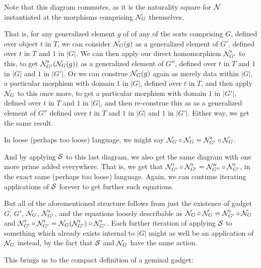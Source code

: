 \begin{observation}
Note that this diagram commutes, as it is the naturality square for $\mathcal{N}$ instantiated at the morphisms comprising $\mathcal{N}_G$ themselves.

That is, for any generalized element $g$ of of any of the sorts comprising $G$, defined over object $t$ in $T$, we can consider $\mathcal{N}_G(g)$ as a generalized element of $G'$, defined over $t$ in $T$ and $1$ in $|G|$. We can then apply our direct homomorphism $\mathcal{N}'_{G'}$ to this, to get $\mathcal{N}'_{G'}(\mathcal{N}_G(g))$ as a generalized element of $G''$, defined over $t$ in $T$ and $1$ in $|G|$ and $1$ in $|G'|$. Or we can construe $\mathcal{N}_G(g)$ again as merely data within $|G|$, a particular morphism with domain $1$ in $|G|$, defined over $t$ in $T$, and then apply $\mathcal{N}_G$ to this once more, to get a particular morphism with domain $1$ in $|G'|$, defined over $t$ in $T$ and $1$ in $|G|$, and then re-construe this as as a generalized element of $G''$ defined over $t$ in $T$ and $1$ in $|G|$ and $1$ in $|G'|$. Either way, we get the same result.

In loose (perhaps too loose) language, we might say $\mathcal{N}_G \circ \mathcal{N}_G = \mathcal{N}'_{G'} \circ \mathcal{N}_G$.

And by applying $\mathcal{S}$ to this last diagram, we also get the same diagram with one more prime added everywhere. That is, we get that $\mathcal{N}'_{G'} \circ \mathcal{N}'_{G'} = \mathcal{N}''_{G''} \circ \mathcal{N}'_{G'}$, in the exact same (perhaps too loose) language. Again, we can continue iterating applications of $\mathcal{S}$ forever to get further such equations.

But all of the aforementioned structure follows from just the existence of gadget $G$, $G'$, $\mathcal{N}_G$, $\mathcal{N}'_{G'}$, and the equations loosely describable as $\mathcal{N}_G \circ \mathcal{N}_G = \mathcal{N}'_{G'} \circ \mathcal{N}_G$ and $\mathcal{N}'_{G'} \circ \mathcal{N}'_{G'} = \mathcal{N}_G(\mathcal{N}'_{G'}) \circ \mathcal{N}'_{G'}$. Each further iteration of applying $\mathcal{S}$ to something which already exists internal to $|G|$ might as well be an application of $\mathcal{N}_{G}$ instead, by the fact that $\mathcal{S}$ and $\mathcal{N}_{G}$ have the same action.
\end{observation}

This brings us to the compact definition of a geminal gadget:

